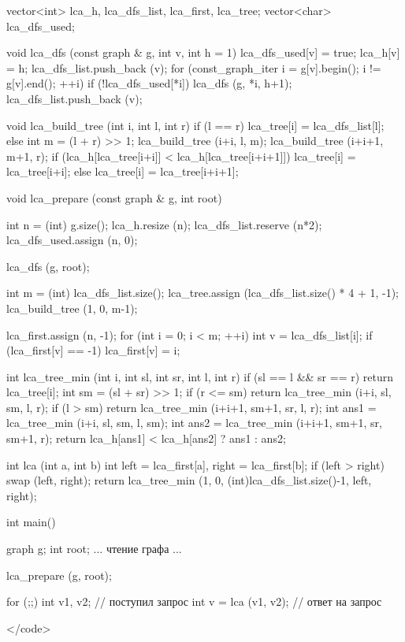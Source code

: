 vector<int> lca_h, lca_dfs_list, lca_first, lca_tree;
vector<char> lca_dfs_used;

void lca_dfs (const graph & g, int v, int h = 1)
{
	lca_dfs_used[v] = true;
	lca_h[v] = h;
	lca_dfs_list.push_back (v);
	for (const_graph_iter i = g[v].begin(); i != g[v].end(); ++i)
		if (!lca_dfs_used[*i])
		{
			lca_dfs (g, *i, h+1);
			lca_dfs_list.push_back (v);
		}
}

void lca_build_tree (int i, int l, int r)
{
	if (l == r)
		lca_tree[i] = lca_dfs_list[l];
	else
	{
		int m = (l + r) >> 1;
		lca_build_tree (i+i, l, m);
		lca_build_tree (i+i+1, m+1, r);
		if (lca_h[lca_tree[i+i]] < lca_h[lca_tree[i+i+1]])
			lca_tree[i] = lca_tree[i+i];
		else
			lca_tree[i] = lca_tree[i+i+1];
	}
}

void lca_prepare (const graph & g, int root)
{
	int n = (int) g.size();
	lca_h.resize (n);
	lca_dfs_list.reserve (n*2);
	lca_dfs_used.assign (n, 0);

	lca_dfs (g, root);

	int m = (int) lca_dfs_list.size();
	lca_tree.assign (lca_dfs_list.size() * 4 + 1, -1);
	lca_build_tree (1, 0, m-1);

	lca_first.assign (n, -1);
	for (int i = 0; i < m; ++i)
	{
		int v = lca_dfs_list[i];
		if (lca_first[v] == -1)
			lca_first[v] = i;
	}
}

int lca_tree_min (int i, int sl, int sr, int l, int r)
{
	if (sl == l && sr == r)
		return lca_tree[i];
	int sm = (sl + sr) >> 1;
	if (r <= sm)
		return lca_tree_min (i+i, sl, sm, l, r);
	if (l > sm)
		return lca_tree_min (i+i+1, sm+1, sr, l, r);
	int ans1 = lca_tree_min (i+i, sl, sm, l, sm);
	int ans2 = lca_tree_min (i+i+1, sm+1, sr, sm+1, r);
	return lca_h[ans1] < lca_h[ans2] ? ans1 : ans2;
}

int lca (int a, int b)
{
	int left = lca_first[a],
		right = lca_first[b];
	if (left > right)  swap (left, right);
	return lca_tree_min (1, 0, (int)lca_dfs_list.size()-1, left, right);
}

int main()
{
	graph g;
	int root;
	... чтение графа ...

	lca_prepare (g, root);

	for (;;)
	{
		int v1, v2; // поступил запрос
		int v = lca (v1, v2); // ответ на запрос
	}
}</code>